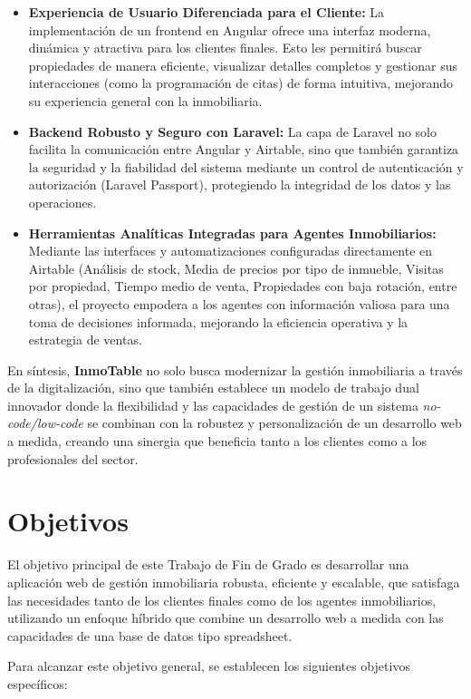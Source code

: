 \begin{itemize}
    \item \textbf{Experiencia de Usuario Diferenciada para el Cliente:} La implementación de un frontend en Angular ofrece una interfaz moderna, dinámica y atractiva para los clientes finales. Esto les permitirá buscar propiedades de manera eficiente, visualizar detalles completos y gestionar sus interacciones (como la programación de citas) de forma intuitiva, mejorando su experiencia general con la inmobiliaria.
    \item \textbf{Backend Robusto y Seguro con Laravel:} La capa de Laravel no solo facilita la comunicación entre Angular y Airtable, sino que también garantiza la seguridad y la fiabilidad del sistema mediante un control de autenticación y autorización (Laravel Passport), protegiendo la integridad de los datos y las operaciones.
    \item \textbf{Herramientas Analíticas Integradas para Agentes Inmobiliarios:} Mediante las interfaces y automatizaciones configuradas directamente en Airtable (Análisis de stock, Media de precios por tipo de inmueble, Visitas por propiedad, Tiempo medio de venta, Propiedades con baja rotación, entre otras), el proyecto empodera a los agentes con información valiosa para una toma de decisiones informada, mejorando la eficiencia operativa y la estrategia de ventas.
\end{itemize}

En síntesis, \textbf{InmoTable} no solo busca modernizar la gestión inmobiliaria a través de la digitalización, sino que también establece un modelo de trabajo dual innovador donde la flexibilidad y las capacidades de gestión de un sistema \textit{no-code/low-code} se combinan con la robustez y personalización de un desarrollo web a medida, creando una sinergia que beneficia tanto a los clientes como a los profesionales del sector.


\section{Objetivos}


El objetivo principal de este Trabajo de Fin de Grado es desarrollar una aplicación web de gestión inmobiliaria robusta, eficiente y escalable, que satisfaga las necesidades tanto de los clientes finales como de los agentes inmobiliarios, utilizando un enfoque híbrido que combine un desarrollo web a medida con las capacidades de una base de datos tipo spreadsheet.

Para alcanzar este objetivo general, se establecen los siguientes objetivos específicos:


